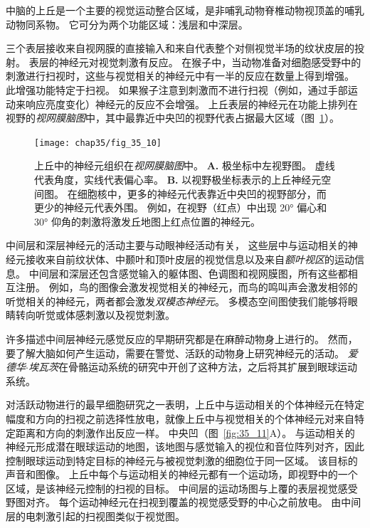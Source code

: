 中脑的上丘是一个主要的视觉运动整合区域，是非哺乳动物脊椎动物视顶盖的哺乳动物同系物。
它可分为两个功能区域：浅层和中深层。


三个表层接收来自视网膜的直接输入和来自代表整个对侧视觉半场的纹状皮层的投射。
表层的神经元对视觉刺激有反应。
在猴子中，当动物准备对细胞感受野中的刺激进行扫视时，这些与视觉相关的神经元中有一半的反应在数量上得到增强。
此增强功能特定于扫视。
如果猴子注意到刺激而不进行扫视（例如，通过手部运动来响应亮度变化）神经元的反应不会增强。
上丘表层的神经元在功能上排列在视野的\textit{视网膜脑图}中，其中最靠近中央凹的视野代表占据最大区域（图~\ref{fig:35_10}）。


\begin{figure}[htbp]
	\centering
	\texttt{[image: chap35/fig\_35\_10]}
	\caption{上丘中的神经元组织在\textit{视网膜脑图}中。
		\textbf{A.} 极坐标中左视野图。
		虚线代表角度，实线代表偏心率。
		\textbf{B.} 以视野极坐标表示的上丘神经元空间图。
		在细胞核中，更多的神经元代表靠近中央凹的视野部分，而更少的神经元代表外围。
		例如，在视野（红点）中出现 20° 偏心和 30° 仰角的刺激将激发丘地图上红点位置的神经元\cite{aizawa1998reversible}。}
	\label{fig:35_10}
\end{figure}


中间层和深层神经元的活动主要与动眼神经活动有关，
这些层中与运动相关的神经元接收来自前纹状体、中颞叶和顶叶皮层的视觉信息以及来自\textit{额叶视区}的运动信息。
中间层和深层还包含感觉输入的躯体图、色调图和视网膜图，所有这些都相互注册。
例如，鸟的图像会激发视觉相关的神经元，而鸟的鸣叫声会激发相邻的听觉相关的神经元，两者都会激发\textit{双模态神经元}。
多模态空间图使我们能够将眼睛转向听觉或体感刺激以及视觉刺激。


许多描述中间层神经元感觉反应的早期研究都是在麻醉动物身上进行的。
然而，要了解大脑如何产生运动，需要在警觉、活跃的动物身上研究神经元的活动。
\textit{爱德华$\cdot$埃瓦茨}在骨骼运动系统的研究中开创了这种方法，之后将其扩展到眼球运动系统。


对活跃动物进行的最早细胞研究之一表明，上丘中与运动相关的个体神经元在特定幅度和方向的扫视之前选择性放电，就像上丘中与视觉相关的个体神经元对来自特定距离和方向的刺激作出反应一样。
中央凹（图~\ref{fig:35_11}A）。
与运动相关的神经元形成潜在眼球运动的地图，该地图与感觉输入的视位和音位阵列对齐，因此控制眼球运动到特定目标的神经元与被视觉刺激的细胞位于同一区域。
该目标的声音和图像。
上丘中每个与运动相关的神经元都有一个运动场，即视野中的一个区域，是该神经元控制的扫视的目标。
中间层的运动场图与上覆的表层视觉感受野图对齐。
每个运动神经元在扫视到覆盖的视觉感受野的中心之前放电。
由中间层的电刺激引起的扫视图类似于视觉图。


